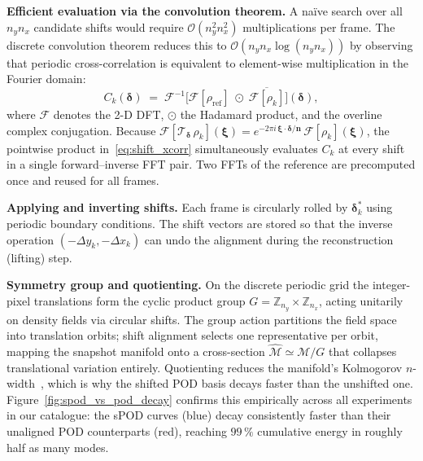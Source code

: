 \noindent\textbf{Efficient evaluation via the convolution theorem.}
A na\"ive search over all $n_y n_x$ candidate shifts would require
$\mathcal{O}(n_y^2 n_x^2)$ multiplications per frame.
The discrete convolution theorem reduces this to
$\mathcal{O}(n_y n_x \log(n_y n_x))$ by observing that periodic
cross-correlation is equivalent to element-wise multiplication in the
Fourier domain:
\begin{equation}
  C_k(\boldsymbol{\delta})
  \;=\;
  \mathcal{F}^{-1}\!\bigl[
    \mathcal{F}[\rho_{\mathrm{ref}}]
    \;\odot\;
    \overline{\mathcal{F}[\rho_k]}
  \bigr](\boldsymbol{\delta}),
  \label{eq:shift_xcorr}
\end{equation}
where $\mathcal{F}$ denotes the 2-D DFT, $\odot$ the Hadamard product,
and the overline complex conjugation.  Because
$\mathcal{F}[\mathcal{T}_{\boldsymbol{\delta}}\,\rho_k](\boldsymbol{\xi})
= e^{-2\pi i\,\boldsymbol{\xi}\cdot\boldsymbol{\delta}/\boldsymbol{n}}\,
\mathcal{F}[\rho_k](\boldsymbol{\xi})$,
the pointwise product in~\eqref{eq:shift_xcorr} simultaneously evaluates
$C_k$ at every shift in a single forward--inverse FFT pair.  Two FFTs of
the reference are precomputed once and reused for all frames.

\noindent\textbf{Applying and inverting shifts.}
Each frame is circularly rolled by $\boldsymbol{\delta}_k^*$ using
periodic boundary conditions.  The shift
vectors are stored so that the inverse operation
$(-\Delta y_k,-\Delta x_k)$ can undo the alignment during the
reconstruction (lifting) step.

\noindent\textbf{Symmetry group and quotienting.}
On the discrete periodic grid the integer-pixel translations form the
cyclic product group
$G = \mathbb{Z}_{n_y}\!\times\!\mathbb{Z}_{n_x}$, acting unitarily on
density fields via circular shifts.  The group action partitions the
field space into translation orbits; shift alignment selects one
representative per orbit, mapping the snapshot manifold onto a
cross-section $\hat{\mathcal{M}}\simeq\mathcal{M}/G$ that collapses
translational variation entirely.  Quotienting reduces the manifold's
Kolmogorov $n$-width~\cite{peherstorfer2022kolmogorov}, which is why the
shifted POD basis decays faster than the unshifted one.
Figure~\ref{fig:spod_vs_pod_decay} confirms this empirically across all
experiments in our catalogue: the sPOD curves (blue) decay
consistently faster than their unaligned POD counterparts (red), reaching
$99\,\%$ cumulative energy in roughly half as many modes.

